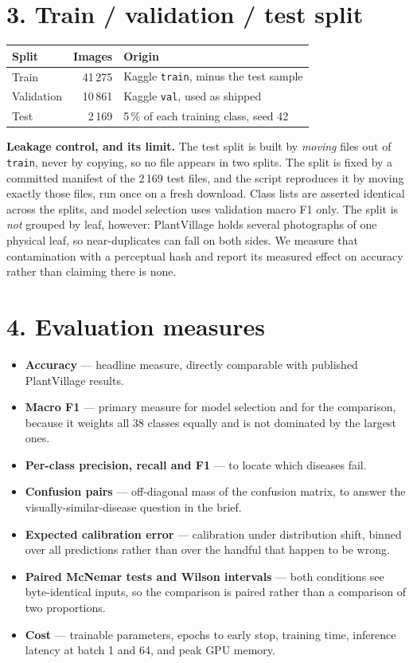 \documentclass[10pt,a4paper]{article}
\begin{document}
\section*{3. Train / validation / test split}

\begin{tabular}{lrl}
\toprule
\textbf{Split} & \textbf{Images} & \textbf{Origin} \\
\midrule
Train & 41\,275 & Kaggle \texttt{train}, minus the test sample \\
Validation & 10\,861 & Kaggle \texttt{val}, used as shipped \\
Test & 2\,169 & 5\,\% of each training class, seed 42 \\
\bottomrule
\end{tabular}

\textbf{Leakage control, and its limit.} The test split is built by \emph{moving} files out of
\texttt{train}, never by copying, so no file appears in two splits. The split is fixed by a
committed manifest of the 2\,169 test files, and the script reproduces it by moving exactly those
files, run once on a fresh download. Class lists are asserted identical across the
splits, and model selection uses validation macro F1 only. The split is \emph{not} grouped by leaf,
however: PlantVillage holds several photographs of one physical leaf, so near-duplicates can fall on
both sides. We measure that contamination with a perceptual hash and report its measured effect on
accuracy rather than claiming there is none.

\section*{4. Evaluation measures}

\begin{itemize}
  \item \textbf{Accuracy} --- headline measure, directly comparable with published PlantVillage results.
  \item \textbf{Macro F1} --- primary measure for model selection and for the comparison, because it
        weights all 38 classes equally and is not dominated by the largest ones.
  \item \textbf{Per-class precision, recall and F1} --- to locate which diseases fail.
  \item \textbf{Confusion pairs} --- off-diagonal mass of the confusion matrix, to answer the
        visually-similar-disease question in the brief.
  \item \textbf{Expected calibration error} --- calibration under distribution shift, binned over
        all predictions rather than over the handful that happen to be wrong.
  \item \textbf{Paired McNemar tests and Wilson intervals} --- both conditions see byte-identical
        inputs, so the comparison is paired rather than a comparison of two proportions.
  \item \textbf{Cost} --- trainable parameters, epochs to early stop, training time, inference
        latency at batch 1 and 64, and peak GPU memory.
\end{itemize}
\end{document}
